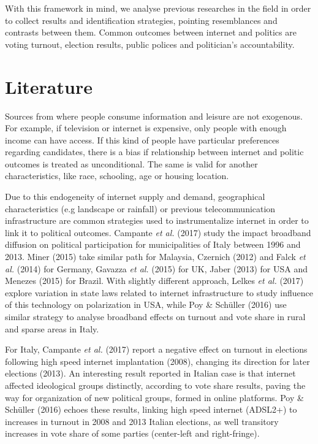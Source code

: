\documentclass[12pt,]{article}
\begin{document}
With this framework in mind, we analyse previous researches in the field
in order to collect results and identification strategies, pointing
resemblances and contrasts between them. Common outcomes between
internet and politics are voting turnout, election results, public
polices and politician's accountability.

\hypertarget{literature}{%
\section{Literature}\label{literature}}

Sources from where people consume information and leisure are not
exogenous. For example, if television or internet is expensive, only
people with enough income can have access. If this kind of people have
particular preferences regarding candidates, there is a bias if
relationship between internet and politic outcomes is treated as
unconditional. The same is valid for another characteristics, like race,
schooling, age or housing location.

Due to this endogeneity of internet supply and demand, geographical
characteristics (e.g landscape or rainfall) or previous
telecommunication infrastructure are common strategies used to
instrumentalize internet in order to link it to political outcomes.
Campante \emph{et al.} (2017) study the impact broadband diffusion on
political participation for municipalities of Italy between 1996 and
2013. Miner (2015) take similar path for Malaysia, Czernich (2012) and
Falck \emph{et al.} (2014) for Germany, Gavazza \emph{et al.} (2015) for
UK, Jaber (2013) for USA and Menezes (2015) for Brazil. With slightly
different approach, Lelkes \emph{et al.} (2017) explore variation in
state laws related to internet infrastructure to study influence of this
technology on polarization in USA, while Poy \& Schüller (2016) use
similar strategy to analyse broadband effects on turnout and vote share
in rural and sparse areas in Italy.

For Italy, Campante \emph{et al.} (2017) report a negative effect on
turnout in elections following high speed internet implantation (2008),
changing its direction for later elections (2013). An interesting result
reported in Italian case is that internet affected ideological groups
distinctly, according to vote share results, paving the way for
organization of new political groups, formed in online platforms. Poy \&
Schüller (2016) echoes these results, linking high speed internet
(ADSL2+) to increases in turnout in 2008 and 2013 Italian elections, as
well transitory increases in vote share of some parties (center-left and
right-fringe).
\end{document}
